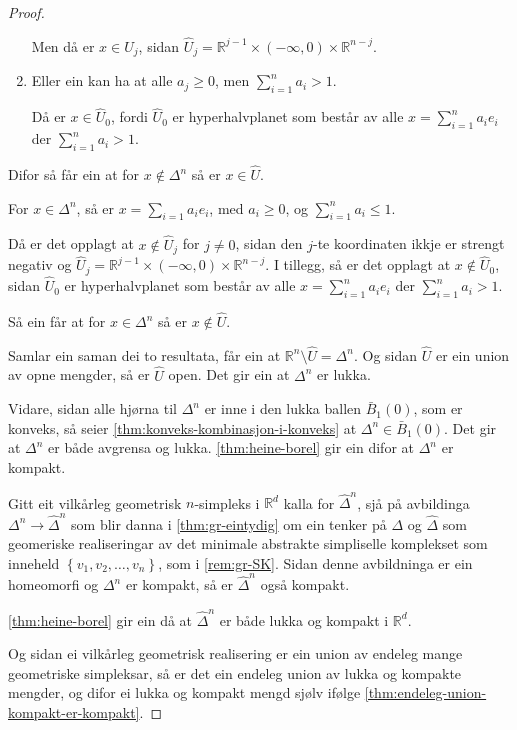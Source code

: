 \documentclass[a4paper, 12pt, norsk]{article}
\theoremstyle{plain}
\theoremstyle{definition}
\newcommand{\Rb}{\mathbb{R}}
\newcommand{\set}[1]{ \left\{ #1 \right\} } %
\begin{document}
\begin{proof}
\begin{enumerate}
{				Men då er \( x \in \hat{U}_j \), sidan \( \hat{U}_j = \Rb^{j-1}\times(-\infty, 0) \times \Rb^{n-j} \). }
  		\item { Eller ein kan ha at alle \( a_j \geq 0 \), men \( \sum_{i=1}^n a_i > 1 \). 
		
				 Då er \( x \in \hat{U}_0 \), fordi \( \hat{U}_0 \) er hyperhalvplanet som består av alle \( x = \sum_{i = 1}^n a_i e_i \) der \( \sum_{i = 1}^n a_i > 1 \). }
	\end{enumerate}

	Difor så får ein at for \( x \not\in \Delta^n \) så er \( x \in \hat{U} \).

	For \( x \in \Delta^n \), så er \( x = \sum_{i=1} a_i e_i \), med \( a_i \geq 0 \), og \( \sum_{i=1}^n a_i \leq 1 \).

	Då er det opplagt at \( x \not\in \hat{U}_j \) for \( j \neq 0 \), sidan den \( j \)-te koordinaten ikkje er strengt negativ og \( \hat{U}_j = \Rb^{j-1}\times(-\infty, 0) \times \Rb^{n-j} \). I tillegg, så er det opplagt at \( x \not\in \hat{U}_0 \), sidan \( \hat{U}_0 \) er hyperhalvplanet som består av alle \( x = \sum_{i = 1}^n a_i e_i \) der \( \sum_{i = 1}^n a_i > 1 \).

	Så ein får at for \( x \in \Delta^n \) så er \( x \not\in \hat{U} \).

	Samlar ein saman dei to resultata, får ein at \( \Rb^n \setminus \hat{U} = \Delta^n \). Og sidan \( \hat{U} \) er ein union av opne mengder, så er \( \hat{U} \) open. Det gir ein at \( \Delta^n \) er lukka.

	Vidare, sidan alle hjørna til \( \Delta^n \) er inne i den lukka ballen \( \bar{B}_{1}(0) \), som er konveks, så seier \autoref{thm:konveks-kombinasjon-i-konveks} at \( \Delta^n \in \bar{B}_{1}(0) \). Det gir at \( \Delta^n \) er både avgrensa og lukka. \autoref{thm:heine-borel} gir ein difor at \( \Delta^n \) er kompakt.

	Gitt eit vilkårleg geometrisk \( n \)-simpleks i \( \Rb^d \) kalla for \( \hat{\Delta}^n \), sjå på avbildinga \( \Delta^n \to \hat{\Delta}^n \) som blir danna i \autoref{thm:gr-eintydig} om ein tenker på \( \Delta \) og \( \hat{\Delta} \) som geomeriske realiseringar av det minimale abstrakte simpliselle komplekset som inneheld \( \set{v_1, v_2, \dots, v_n} \), som i \autoref{rem:gr-SK}. Sidan denne avbildninga er ein homeomorfi og \( \Delta^n \) er kompakt, så er \( \hat{\Delta}^n \) også kompakt.

	\autoref{thm:heine-borel} gir ein då at \( \hat{\Delta}^n \) er både lukka og kompakt i \( \Rb^d \).

	Og sidan ei vilkårleg geometrisk realisering er ein union av endeleg mange geometriske simpleksar, så er det ein endeleg union av lukka og kompakte mengder, og difor ei lukka og kompakt mengd sjølv ifølge \autoref{thm:endeleg-union-kompakt-er-kompakt}.
\end{proof}
\end{document}
